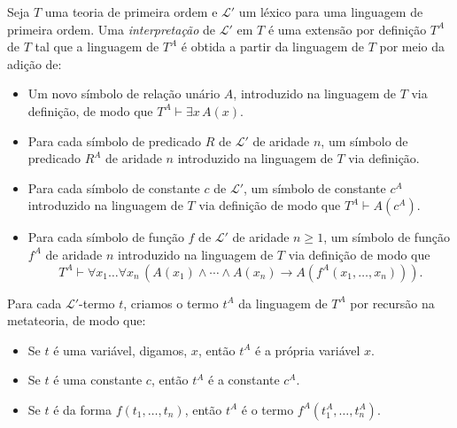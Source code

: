 \begin{metadefinition}
    Seja $T$ uma teoria de primeira ordem e $\mathcal L'$ um léxico para uma linguagem de primeira ordem.
    Uma \emph{interpretação} de $\mathcal L'$ em $T$ é uma extensão por definição $T^A$ de $T$ tal que a linguagem de $T^A$ é obtida a partir da linguagem de $T$ por meio da adição de:
    \begin{itemize}
        \item Um novo símbolo de relação unário $A$, introduzido na linguagem de $T$ via definição, de modo que $T^A\vdash \exists x\, A(x)$.
        \item Para cada símbolo de predicado $R$ de $\mathcal L'$ de aridade $n$, um símbolo de predicado $R^A$ de aridade $n$ introduzido na linguagem de $T$ via definição.
        \item Para cada símbolo de constante $c$ de $\mathcal L'$, um símbolo de constante $c^A$ introduzido na linguagem de $T$ via definição de modo que $T^A\vdash A(c^A)$.
        \item Para cada símbolo de função $f$ de $\mathcal L'$ de aridade $n\geq1$, um símbolo de função $f^A$ de aridade $n$ introduzido na linguagem de $T$ via definição de modo que
        \[
            T^A\vdash \forall x_1 \ldots \forall x_n\, (A(x_1)\wedge \cdots \wedge A(x_n)\rightarrow A(f^A(x_1, \dots, x_n))).
        \]
    \end{itemize}

    Para cada $\mathcal L'$-termo $t$, criamos o termo $t^A$ da linguagem de $T^A$ por recursão na metateoria, de modo que:
    \begin{itemize}
        \item Se $t$ é uma variável, digamos, $x$, então $t^A$ é a própria variável $x$.
        \item Se $t$ é uma constante $c$, então $t^A$ é a constante $c^A$.
        \item Se $t$ é da forma $f(t_1, \dots, t_n)$, então $t^A$ é o termo $f^A(t_1^A, \dots, t_n^A)$.
    \end{itemize}


\end{metadefinition}
